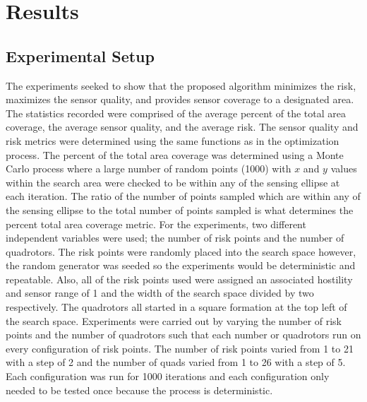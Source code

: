 \documentclass[12pt]{article}
\begin{document}
\section{Results}

\subsection{Experimental Setup}

The experiments seeked to show that the proposed algorithm minimizes the risk,
maximizes the sensor quality, and provides sensor coverage to a designated
area. The statistics recorded were comprised of the average percent of the
total area coverage, the average sensor quality, and the average risk. The
sensor quality and risk metrics were determined using the same functions as in
the optimization process. The percent of the total area coverage was determined
using a Monte Carlo process where a large number of random points (1000) with
$x$ and $y$ values within the search area were checked to be within any of the
sensing ellipse at each iteration. The ratio of the number of points sampled
which are within any of the sensing ellipse to the total number of points
sampled is what determines the percent total area coverage metric. For the
experiments, two different independent variables were used; the number of risk
points and the number of quadrotors. The risk points were randomly placed into
the search space however, the random generator was seeded so the experiments
would be deterministic and repeatable. Also, all of the risk points used were
assigned an associated hostility and sensor range of 1 and the width of the
search space divided by two respectively. The quadrotors all started in a
square formation at the top left of the search space. Experiments were carried
out by varying the number of risk points and the number of quadrotors such that
each number or quadrotors run on every configuration of risk points. The number
of risk points varied from 1 to 21 with a step of 2 and the number of quads
varied from 1 to 26 with a step of 5. Each configuration was run for 1000
iterations and each configuration only needed to be tested once because the
process is deterministic. 
\end{document}
